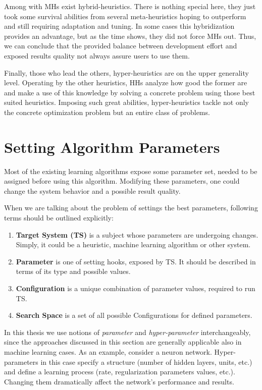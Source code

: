 Among with MHs exist hybrid-heuristics. There is nothing special here, they just took some survival abilities from several meta-heuristics hoping to outperform and still requiring adaptation and tuning. In some cases this hybridization provides an advantage, but as the time shows, they did not force MHs out. Thus, we can conclude that the provided balance between development effort and exposed results quality not always assure users to use them.

Finally, those who lead the others, hyper-heuristics are on the upper generality level. 
Operating by the other heuristics, HHs analyze how good the former are and make a use of this knowledge by solving a concrete problem using those best suited heuristics. Imposing such great abilities, hyper-heuristics tackle not only the concrete optimization problem but an entire class of problems.


\section{Setting Algorithm Parameters}\label{bg: section Parameters Setting}
Most of the existing learning algorithms expose some parameter set, needed to be assigned before using this algorithm. Modifying these parameters, one could change the system behavior and a possible result quality.

When we are talking about the problem of settings the best parameters, following terms should be outlined explicitly:
\begin{enumerate}
	\item \textbf{Target System (TS)} is a subject whose parameters are undergoing changes. Simply, it could be a heuristic, machine learning algorithm or other system.
	\item \textbf{Parameter} is one of setting hooks, exposed by TS. It should be described in terms of its type and possible values.
	\item \textbf{Configuration} is a unique combination of parameter values, required to run TS.
	\item \textbf{Search Space} is a set of all possible Configurations for defined parameters.
\end{enumerate}

In this thesis we use notions of \emph{parameter} and \emph{hyper-parameter} interchangeably, since the approaches discussed in this section are generally applicable also in machine learning cases. As an example, consider a neuron network. Hyper-parameters in this case specify a structure (number of hidden layers, units, etc.) and define a learning process (rate, regularization parameters values, etc.). Changing them dramatically affect the network's performance and results.

